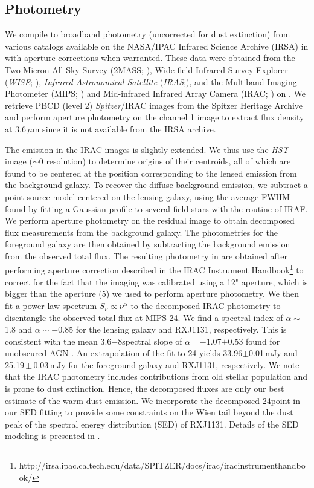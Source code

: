 \documentclass[]{emulateapj}
\begin{document}
\subsection{Photometry} \label{sec:photometry} %
We compile \mir to \fir broadband photometry (uncorrected for
dust extinction) from various
catalogs available on the NASA/IPAC Infrared Science
Archive (IRSA) in  with aperture corrections
when warranted. These data were obtained from
the Two Micron All Sky Survey (2MASS; \citealt{Skrutskie06a}),
Wide-field Infrared Survey Explorer ({\it WISE}; \citealt{Wright10a}),
{\it Infrared Astronomical Satellite}
({\it IRAS};\citealt{Neugebauer84a}), and
the Multiband Imaging Photometer (MIPS; \citealt{Rieke04a}) and
Mid-infrared Infrared Array Camera (IRAC; \citealt{Fazio04a}) on
\spitzer.
We retrieve PBCD (level 2) {\it Spitzer}/IRAC images from the
Spitzer Heritage Archive and perform aperture photometry on
the channel 1 image to extract flux density at 3.6\,$\mu$m
since it is not available from the IRSA archive.

The emission in the IRAC images is slightly extended. We thus use the
{\it HST} image ($\sim$0 resolution) to determine
origins of their centroids, all of which are found to be
centered at the position corresponding to the lensed emission from the
background galaxy. To recover the diffuse background emission, we subtract a
point source model centered on the lensing galaxy, using the average
FWHM found by fitting a Gaussian profile to several field stars
with the  routine of IRAF.
We perform aperture photometry on the residual image
to obtain decomposed flux measurements from the background galaxy.
The photometries for the foreground galaxy are then obtained
by subtracting the background emission from the
observed total flux. The resulting photometry in
 are obtained after performing aperture correction
described in the IRAC Instrument Handbook\footnote{http://irsa.ipac.caltech.edu/data/SPITZER/docs/irac/iracinstrumenthandbook/} to
correct for the fact that the imaging was calibrated
using a 12" aperture, which is bigger than the aperture (5) we used to
perform aperture photometry.
We then fit a power-law spectrum $S_\nu \propto \nu^\alpha$ to the
decomposed IRAC photometry to disentangle the observed total flux
at MIPS 24\micron. We find a spectral index of $\alpha\sim-$1.8 and
$\alpha\sim-$0.85 for the lensing galaxy and RXJ1131, respectively.
This is consistent with the mean 3.6$-$8\micron spectral slope of
$\alpha$\,=\,$-$1.07$\pm$0.53 found for unobscured AGN
\citep{Stern05a}. An extrapolation of the fit to 24\micron
yields 33.96$\pm$0.01\,mJy and 25.19\,$\pm$\,0.03\,mJy
for the foreground galaxy and RXJ1131, respectively.
We note that the IRAC photometry includes
contributions from old stellar population and is prone to
dust extinction. Hence, the decomposed fluxes are only
our best estimate of the warm dust emission.
We incorporate the decomposed 24\micron point in our
SED fitting to provide some constraints on
the Wien tail beyond the dust peak
of the spectral energy distribution (SED) of RXJ1131.
Details of the SED modeling is presented in .
\end{document}

